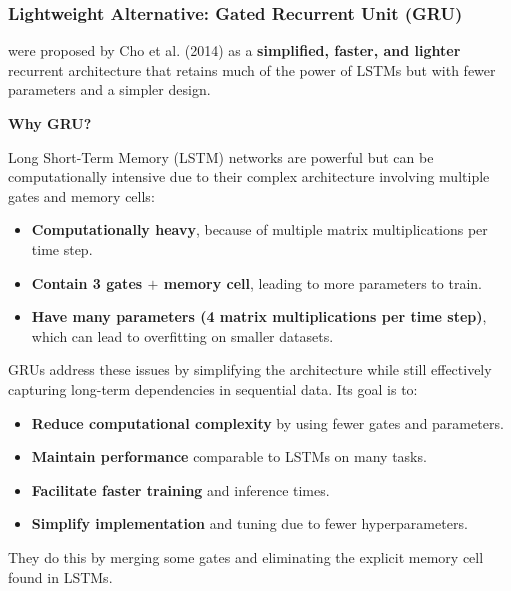 \subsubsection{Lightweight Alternative: Gated Recurrent Unit (GRU)}

 were proposed by Cho et al. (2014) as a \textbf{simplified, faster, and lighter} recurrent architecture that retains much of the power of LSTMs but with fewer parameters and a simpler design.

\highspace
\begin{flushleft}
    \textcolor{Green3}{ \textbf{Why GRU?}} \\
\end{flushleft}
Long Short-Term Memory (LSTM) networks are powerful but can be computationally intensive due to their complex architecture involving multiple gates and memory cells:
\begin{itemize}
    \item[\textcolor{Red2}{\faIcon{times}}] \textbf{Computationally heavy}, because of multiple matrix multiplications per time step.
    \item[\textcolor{Red2}{\faIcon{times}}] \textbf{Contain 3 gates $+$ memory cell}, leading to more parameters to train.
    \item[\textcolor{Red2}{\faIcon{times}}] \textbf{Have many parameters (4 matrix multiplications per time step)}, which can lead to overfitting on smaller datasets.
\end{itemize}
GRUs address these issues by simplifying the architecture while still effectively capturing long-term dependencies in sequential data. Its goal is to:
\begin{itemize}
    \item[\textcolor{Green3}{\faIcon{check}}] \textbf{Reduce computational complexity} by using fewer gates and parameters.
    \item[\textcolor{Green3}{\faIcon{check}}] \textbf{Maintain performance} comparable to LSTMs on many tasks.
    \item[\textcolor{Green3}{\faIcon{check}}] \textbf{Facilitate faster training} and inference times.
    \item[\textcolor{Green3}{\faIcon{check}}] \textbf{Simplify implementation} and tuning due to fewer hyperparameters.
\end{itemize}
They do this by merging some gates and eliminating the explicit memory cell found in LSTMs.

